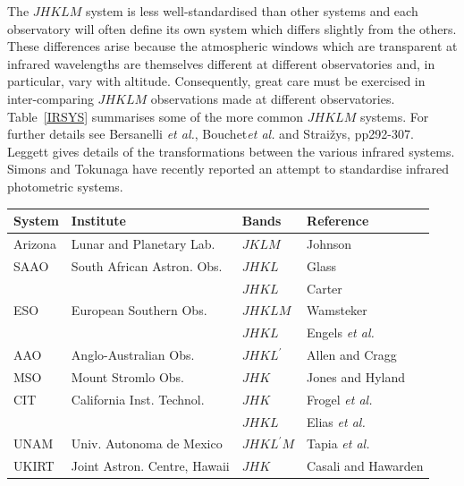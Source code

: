 \documentclass[twoside,11pt,nolof]{starlink}
\begin{document}
\begin{description}
   The $JHKLM$ system is less well-standardised than other systems and
   each observatory will often define its own system which differs slightly
   from the others.  These differences arise because the atmospheric
   windows which are transparent at infrared wavelengths are themselves
   different at different observatories and, in particular, vary with
   altitude.  Consequently, great care must be exercised in inter-comparing
   $JHKLM$ observations made at different observatories.
   Table~\ref{IRSYS} summarises some of the more common $JHKLM$ systems.
   For further details see Bersanelli \textit{et al.}\/\cite{BERSANELLI91},
   Bouchet\textit{et al.}\/\cite{BOUCHET91} and Strai\v{z}ys\cite{STRAIZYS92},
   pp292-307.  Leggett\cite{LEGGETT92} gives details of the transformations
   between the various infrared systems.  Simons and Tokunaga\cite{SIMONS01}
   have recently reported an attempt to standardise infrared photometric
   systems.

  \begin{table}[htbp]

  \begin{center}
  \begin{tabular}{llll}
   System  & Institute                    & Bands   & Reference \\ \hline
   Arizona & Lunar and Planetary Lab.     & $JKLM$  & Johnson\cite{JOHNSON64} \\
   SAAO    & South African Astron. Obs.   & $JHKL$  & Glass\cite{GLASS74} \\
           &                              & $JHKL$  & Carter\cite{CARTER84, CARTER90} \\
   ESO     & European Southern Obs.       & $JHKLM$ & Wamsteker\cite{WAMSTEKER81} \\
           &                              & $JHKL$  & Engels \textit{et al.}\/\cite{ENGELS81} \\
   AAO     & Anglo-Australian Obs.        & $JHKL^{\prime}$ & Allen and Cragg\cite{ALLEN83} \\
   MSO     & Mount Stromlo Obs.           & $JHK$   & Jones and Hyland\cite{JONES82} \\
   CIT     & California Inst. Technol.    & $JHK$   & Frogel \textit{et al.}\/\cite{FROGEL78} \\
           &                              & $JHKL$  & Elias \textit{et al.}\/\cite{ELIAS82, ELIAS83} \\
   UNAM    & Univ. Autonoma de Mexico     & $JHKL^{\prime} M$ & Tapia \textit{et al.}\/\cite{TAPIA86} \\
   UKIRT   & Joint Astron. Centre, Hawaii & $JHK$   & Casali and Hawarden\cite{CASALI92} \\
  \end{tabular}
  \end{center}


\end{table}
\end{description}
\end{document}
